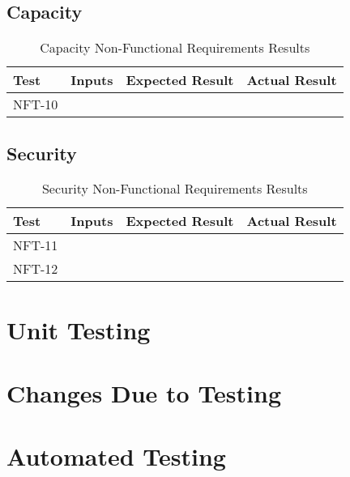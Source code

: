 \documentclass[12pt, titlepage]{article}
\begin{document}
\subsection{Capacity}

\begin{table}[H]
  \centering
    \setlength{\leftmargini}{0cm}
    \begin{tabular}{| >{\centering\arraybackslash}m{1.5cm} | 
      >{\centering\arraybackslash}m{4cm} | 
      >{\centering\arraybackslash}m{4cm} | 
      >{\centering\arraybackslash}m{4cm} |}
    \hline
    \rowcolor[gray]{0.9}
    Test & Inputs & Expected Result & Actual Result\\
    \hline
    NFT-10 &  &  & \\
    \hline
    \end{tabular}
  \caption{Capacity Non-Functional Requirements Results}
\end{table}

\subsection{Security}

\begin{table}[H]
  \centering
    \setlength{\leftmargini}{0cm}
    \begin{tabular}{| >{\centering\arraybackslash}m{1.5cm} | 
      >{\centering\arraybackslash}m{4cm} | 
      >{\centering\arraybackslash}m{4cm} | 
      >{\centering\arraybackslash}m{4cm} |}
    \hline
    \rowcolor[gray]{0.9}
    Test & Inputs & Expected Result & Actual Result\\
    \hline
    NFT-11 &  &  & \\
    \hline
    NFT-12 &  &  & \\
    \hline
    \end{tabular}
  \caption{Security Non-Functional Requirements Results}
\end{table}

\section{Unit Testing}

\section{Changes Due to Testing}

\section{Automated Testing}
		
\end{document}

